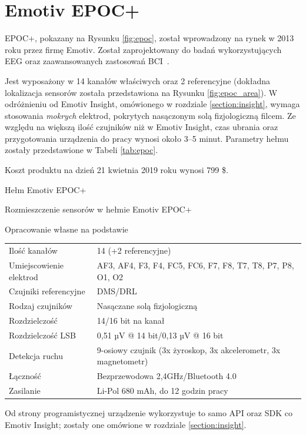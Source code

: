 \documentclass[skorowidz,skroty]{dyplomWEZUT}
\begin{document}
\section{Emotiv EPOC+\label{section:epoc}}
EPOC+, pokazany na Rysunku \vref{fig:epoc}, został wprowadzony na rynek w 2013 roku przez firmę Emotiv. Został zaprojektowany do badań wykorzystujących EEG oraz zaawansowanych zastosowań BCI~\cite{emotiv_epoc}.

Jest wyposażony w 14 kanałów właściwych oraz 2 referencyjne (dokładna lokalizacja sensorów została przedstawiona na Rysunku \vref{fig:epoc_area}). W odróżnieniu od Emotiv Insight, omówionego w rozdziale \vref{section:insight}, wymaga stosowania \textit{mokrych} elektrod, pokrytych nasączonym solą fizjologiczną filcem. Ze względu na większą ilość czujników niż w Emotiv Insight, czas ubrania oraz przygotowania urządzenia do pracy wynosi około 3--5 minut. Parametry hełmu zostały przedstawione w Tabeli \vref{tab:epoc}.

Koszt produktu na dzień 21 kwietnia 2019 roku wynosi 799 \$.

{Hełm Emotiv EPOC+\label{fig:epoc}}
{\cite{emotiv_epoc}}

{Rozmieszczenie sensorów w hełmie Emotiv EPOC+\label{fig:epoc_area}}
{\cite{emotiv_epoc}}

{Opracowanie własne na podstawie~\cite{emotiv_comparison}}
{
    \begin{tabular}{l|l}
        Ilość kanałów & 14 (+2 referencyjne)\\
        Umiejscowienie elektrod & AF3, AF4, F3, F4, FC5, FC6, F7, F8, T7, T8, P7, P8, O1, O2\\
        Czujniki referencyjne & DMS/DRL\\
        Rodzaj czujników & Nasączane solą fizjologiczną\\
        Rozdzielczość & 14/16 bit na kanał\\
        Rozdzielczość LSB & 0,51 µV @ 14 bit/0,13 µV @ 16 bit\\
        Detekcja ruchu & 9-osiowy czujnik (3x żyroskop, 3x akcelerometr, 3x magnetometr)\\
        Łączność & Bezprzewodowa 2,4GHz/Bluetooth 4.0\\
        Zasilanie & Li-Pol 680 mAh, do 12 godzin pracy
    \end{tabular}
}

Od strony programistycznej urządzenie wykorzystuje to samo API oraz SDK co Emotiv Insight; zostały one omówione w rozdziale \vref{section:insight}.
\end{document}
